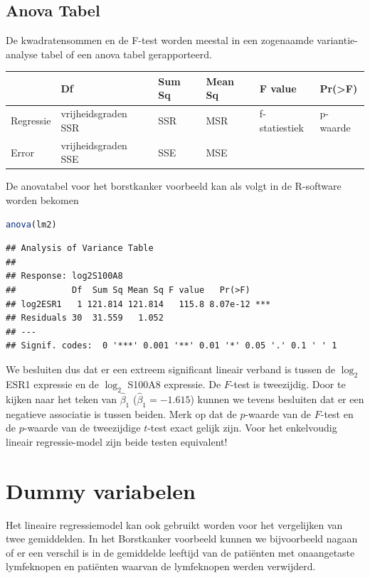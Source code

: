 \documentclass[
  12pt,dutch,coursenotes]{book}
\theoremstyle{definition}
\theoremstyle{definition}
\theoremstyle{definition}
\theoremstyle{definition}
\theoremstyle{remark}
\begin{document}
\hypertarget{anova-tabel}{%
\subsection{Anova Tabel}\label{anova-tabel}}

De kwadratensommen en de F-test worden meestal in een zogenaamde variantie-analyse tabel of een anova tabel gerapporteerd.

\begin{tabular}{l|l|l|l|l|l}
\hline
  & Df & Sum Sq & Mean Sq & F value & Pr(>F)\\
\hline
Regressie & vrijheidsgraden SSR & SSR & MSR & f-statiestiek & p-waarde\\
\hline
Error & vrijheidsgraden SSE & SSE & MSE &  & \\
\hline
\end{tabular}

De anovatabel voor het borstkanker voorbeeld kan als volgt in de R-software worden bekomen

\begin{lstlisting}[language=R]
anova(lm2)
\end{lstlisting}

\begin{lstlisting}
## Analysis of Variance Table
## 
## Response: log2S100A8
##           Df  Sum Sq Mean Sq F value   Pr(>F)    
## log2ESR1   1 121.814 121.814   115.8 8.07e-12 ***
## Residuals 30  31.559   1.052                     
## ---
## Signif. codes:  0 '***' 0.001 '**' 0.01 '*' 0.05 '.' 0.1 ' ' 1
\end{lstlisting}

We besluiten dus dat er een extreem significant lineair verband is tussen de \(\log_2\) ESR1 expressie en de \(\log_2\) S100A8 expressie. De \(F\)-test is tweezijdig. Door te kijken naar het teken van \(\hat\beta_1\) (\(\hat\beta_1=-1.615\)) kunnen we tevens besluiten dat er een negatieve associatie is tussen beiden.
Merk op dat de \(p\)-waarde van de \(F\)-test en de \(p\)-waarde van de tweezijdige \(t\)-test exact gelijk zijn. Voor het enkelvoudig lineair regressie-model zijn beide testen equivalent!

\hypertarget{sec:linDummy}{%
\section{Dummy variabelen}\label{sec:linDummy}}

Het lineaire regressiemodel kan ook gebruikt worden voor het vergelijken van twee gemiddelden.
In het Borstkanker voorbeeld kunnen we bijvoorbeeld nagaan of er een verschil is in de gemiddelde leeftijd van de patiënten met onaangetaste lymfeknopen en patiënten waarvan de lymfeknopen werden verwijderd.
\end{document}
